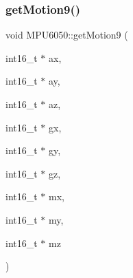 \subsubsection{\texorpdfstring{getMotion9()}{getMotion9()}}
{\footnotesize\ttfamily void M\+P\+U6050\+::get\+Motion9 (\begin{DoxyParamCaption}\item[{int16\+\_\+t $\ast$}]{ax,  }\item[{int16\+\_\+t $\ast$}]{ay,  }\item[{int16\+\_\+t $\ast$}]{az,  }\item[{int16\+\_\+t $\ast$}]{gx,  }\item[{int16\+\_\+t $\ast$}]{gy,  }\item[{int16\+\_\+t $\ast$}]{gz,  }\item[{int16\+\_\+t $\ast$}]{mx,  }\item[{int16\+\_\+t $\ast$}]{my,  }\item[{int16\+\_\+t $\ast$}]{mz }\end{DoxyParamCaption})}

